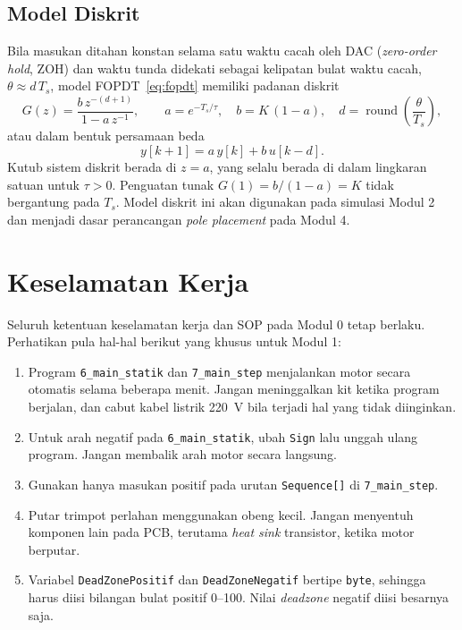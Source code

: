 \documentclass[11pt,a4paper]{article}
\newcommand{\prog}[1]{\texttt{#1}}
\begin{document}
\subsection{Model Diskrit}
Bila masukan ditahan konstan selama satu waktu cacah oleh DAC (\textit{zero-order hold}, ZOH) dan waktu tunda didekati sebagai kelipatan bulat waktu cacah, $\theta \approx d\,T_s$, model FOPDT~\eqref{eq:fopdt} memiliki padanan diskrit
\begin{equation}
	G(z) = \frac{b\,z^{-(d+1)}}{1 - a\,z^{-1}},
	\qquad a = e^{-T_s/\tau}, \quad b = K\,(1 - a), \quad d = \operatorname{round}\!\left(\frac{\theta}{T_s}\right),
	\label{eq:gz}
\end{equation}
atau dalam bentuk persamaan beda
\begin{equation}
	y[k+1] = a\,y[k] + b\,u[k-d].
	\label{eq:beda}
\end{equation}
Kutub sistem diskrit berada di $z = a$, yang selalu berada di dalam lingkaran satuan untuk $\tau > 0$. Penguatan tunak $G(1) = b/(1-a) = K$ tidak bergantung pada $T_s$. Model diskrit ini akan digunakan pada simulasi Modul 2 dan menjadi dasar perancangan \textit{pole placement} pada Modul 4.

\section{Keselamatan Kerja}
Seluruh ketentuan keselamatan kerja dan SOP pada Modul 0 tetap berlaku. Perhatikan pula hal-hal berikut yang khusus untuk Modul 1:
\begin{enumerate}
	\item Program \prog{6\_main\_statik} dan \prog{7\_main\_step} menjalankan motor secara otomatis selama beberapa menit. Jangan meninggalkan kit ketika program berjalan, dan cabut kabel listrik 220~V bila terjadi hal yang tidak diinginkan.
	\item Untuk arah negatif pada \prog{6\_main\_statik}, ubah \texttt{Sign} lalu unggah ulang program. Jangan membalik arah motor secara langsung.
	\item Gunakan hanya masukan positif pada urutan \texttt{Sequence[]} di \prog{7\_main\_step}.
	\item Putar trimpot perlahan menggunakan obeng kecil. Jangan menyentuh komponen lain pada PCB, terutama \textit{heat sink} transistor, ketika motor berputar.
	\item Variabel \texttt{DeadZonePositif} dan \texttt{DeadZoneNegatif} bertipe \texttt{byte}, sehingga harus diisi bilangan bulat positif 0--100. Nilai \textit{deadzone} negatif diisi besarnya saja.
\end{enumerate}
\end{document}
